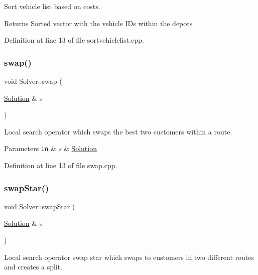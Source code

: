 Sort vehicle list based on costs. 

\begin{DoxyReturn}{Returns}
Sorted vector with the vehicle I\+Ds within the depots 
\end{DoxyReturn}


Definition at line 13 of file sortvehiclelist.\+cpp.

\mbox{\label{class_solver_a9d960b7d4c3b329c430f4f3553bedb31}} 
\subsubsection{\texorpdfstring{swap()}{swap()}}
{\footnotesize\ttfamily void Solver\+::swap (\begin{DoxyParamCaption}\item[{\hyperlink{class_solution}{Solution} \&}]{s }\end{DoxyParamCaption})\hspace{0.3cm}{\ttfamily [private]}}

Local search operator which swaps the best two customers within a route.


\begin{DoxyParams}[1]{Parameters}
\mbox{\tt in}  & {\em s} & \hyperlink{class_solution}{Solution} \\
\hline
\end{DoxyParams}


Definition at line 13 of file swap.\+cpp.

\mbox{\label{class_solver_ab29d1f5b4e31eed975185d77312392a3}} 
\subsubsection{\texorpdfstring{swap\+Star()}{swapStar()}}
{\footnotesize\ttfamily void Solver\+::swap\+Star (\begin{DoxyParamCaption}\item[{\hyperlink{class_solution}{Solution} \&}]{s }\end{DoxyParamCaption})\hspace{0.3cm}{\ttfamily [private]}}



Local search operator swap star which swaps to customers in two different routes and creates a split. 



